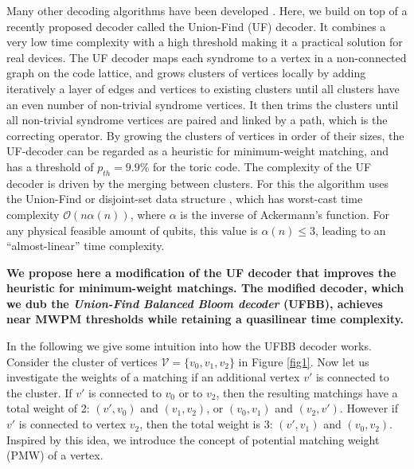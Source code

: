 \documentclass[11pt, a4paper, twoside, titlepage ,dvipsnames]{report}
\begin{document}
Many other decoding algorithms have been developed \cites{fowler2013minimum, duclos2013fault, hutter2015improved, watson2015fast, tuckett2018ultrahigh, kubica2019cellular, torlai2017neural, varsamopoulos2017decoding}. Here, we build on top of a recently proposed decoder called the Union-Find (UF) decoder. It combines a very low time complexity with a high threshold \cite{delfosse2017linear, delfosse2017almost} making it a practical solution for real devices. 
The UF decoder maps each syndrome to a vertex in a non-connected graph on the code lattice, and grows clusters of vertices locally by adding iteratively a layer of edges and vertices to existing clusters until 
all clusters have an even number of non-trivial syndrome vertices. It then trims the clusters until all non-trivial syndrome vertices are paired and linked by a path, which is the correcting operator. 
By growing the clusters of vertices in order of their sizes, the UF-decoder can be regarded as a heuristic for minimum-weight matching, and has a threshold of $p_{th} = 9.9\%$ for the toric code. 
The complexity of the UF decoder is driven by the merging between clusters. For this the algorithm uses the Union-Find or disjoint-set data structure \cite{tarjan1975efficiency}, which has worst-cast time complexity $\mathcal{O}(n\alpha(n))$, where $\alpha$ is the inverse of Ackermann's function. For any physical feasible amount of qubits, this value is $\alpha(n) \leq 3$, leading to an ``almost-linear'' time complexity.

\textbf{We propose here a modification of the UF decoder that improves the heuristic for minimum-weight matchings. The modified decoder, which we dub the \emph{Union-Find Balanced Bloom decoder} (UFBB), achieves near MWPM thresholds while retaining a quasilinear time complexity.}

In the following we give some intuition into how the UFBB decoder works. Consider the cluster of vertices $\mathcal{V}=\{v_0,v_1,v_2\}$ in Figure \ref{fig1}. Now let us investigate the weights of a matching if an additional vertex $v'$ is connected to the cluster. 
If $v'$ is connected to $v_0$ or to $v_2$, then the resulting matchings have a total weight of 2: $(v',v_0)$ and $(v_1,v_2)$, or $(v_0,v_1)$ and $(v_2,v')$. However if $v'$ is connected to vertex $v_2$, then the total weight is 3: $(v', v_1)$ and $(v_0, v_2)$. Inspired by this idea, we introduce the concept of potential matching weight (PMW) of a vertex. 
\end{document}
